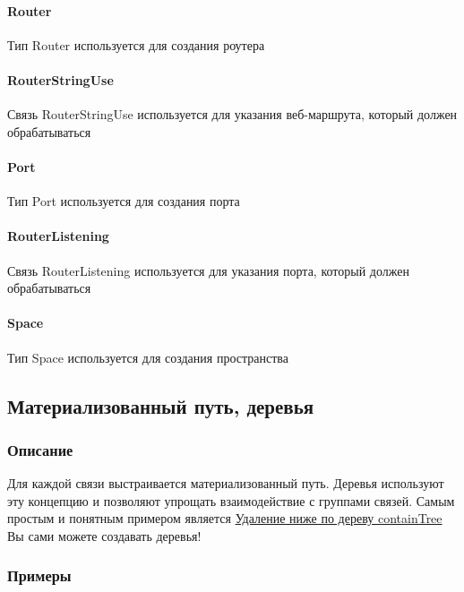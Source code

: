 \documentclass{article}
\begin{document}
\paragraph*{Router}\hypertarget{Core.Router.Description}{}
Тип Router используется для создания роутера
\paragraph*{RouterStringUse}\hypertarget{Core.RouterStringUse.Description}{}
Связь RouterStringUse используется для
указания веб-маршрута, который должен обрабатываться
\paragraph*{Port}\hypertarget{Core.Port.Description}{}
Тип Port используется для создания порта
\paragraph*{RouterListening}\hypertarget{Core.RouterListening.Description}{}
Связь RouterListening используется для
указания порта, который должен обрабатываться
\paragraph*{Space}\hypertarget{Core.Space.Description}{}
Тип Space используется для создания пространства

\subsection{Материализованный путь, деревья}
\subsubsection{Описание}
Для каждой связи выстраивается материализованный путь. Деревья используют эту
концепцию и позволяют упрощать взаимодействие с группами связей.
Самым простым и понятным примером является
\hyperlink{containTree.Deletion.Example}{Удаление ниже по дереву containTree}
Вы сами можете создавать деревья!
\subsubsection{Примеры}
\end{document}

